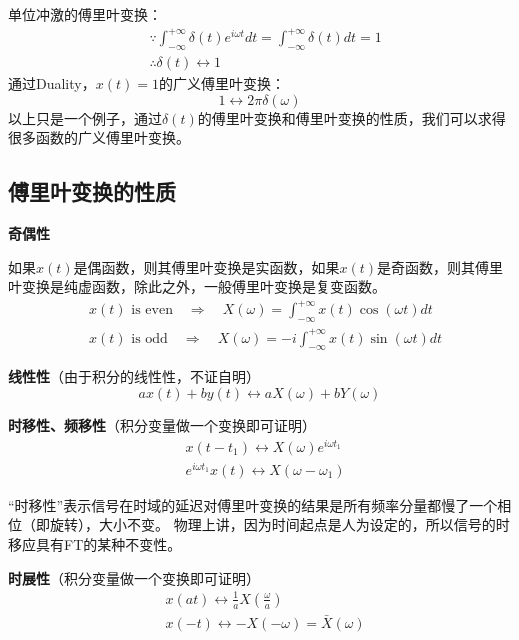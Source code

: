 单位冲激的傅里叶变换：
\begin{align*}
&\because \int_{-\infty}^{+\infty}{\delta \left( t \right) e^{i\omega t}dt}=\int_{-\infty}^{+\infty}{\delta \left( t \right) dt}=1 \\
&\therefore \delta \left( t \right) \leftrightarrow 1
\end{align*}
通过Duality，$x\left( t \right) =1$的广义傅里叶变换：
\[
1\leftrightarrow 2\pi \delta \left( \omega \right)
\]
以上只是一个例子，通过$\delta \left( t \right) $的傅里叶变换和傅里叶变换的性质，我们可以求得很多函数的广义傅里叶变换。

\subsection{傅里叶变换的性质}

{\bf 奇偶性}

如果$x\left( t \right) $是偶函数，则其傅里叶变换是实函数，如果$x\left( t \right) $是奇函数，则其傅里叶变换是纯虚函数，除此之外，一般傅里叶变换是复变函数。
\begin{align*}
&x\left( t \right) \text{ is even} \quad \Rightarrow \quad X\left( \omega \right) =\int_{-\infty}^{+\infty}{x\left( t \right) \cos \left( \omega t \right) dt} \\
&x\left( t \right) \text{ is odd} \quad \Rightarrow \quad X\left( \omega \right) =-i\int_{-\infty}^{+\infty}{x\left( t \right) \sin \left( \omega t \right) dt}
\end{align*}

{\bf 线性性}（由于积分的线性性，不证自明）
\[
ax\left( t \right) +by\left( t \right) \leftrightarrow aX\left( \omega \right) +bY\left( \omega \right)
\]

{\bf 时移性、频移性}（积分变量做一个变换即可证明）
\begin{align*}
&x\left( t-t_1 \right) \leftrightarrow X\left( \omega \right) e^{i\omega t_1} \\
&e^{i\omega t_1}x\left( t \right) \leftrightarrow X\left( \omega -\omega _1 \right)
\end{align*}

“时移性”表示信号在时域的延迟对傅里叶变换的结果是所有频率分量都慢了一个相位（即旋转），大小不变。
物理上讲，因为时间起点是人为设定的，所以信号的时移应具有FT的某种不变性。

{\bf 时展性}（积分变量做一个变换即可证明）
\begin{align*}
&x\left( at \right) \leftrightarrow \frac{1}{a}X\left( \frac{\omega}{a} \right) \\
&x\left( -t \right) \leftrightarrow -X\left( -\omega \right) =\bar{X}\left( \omega \right)
\end{align*}

